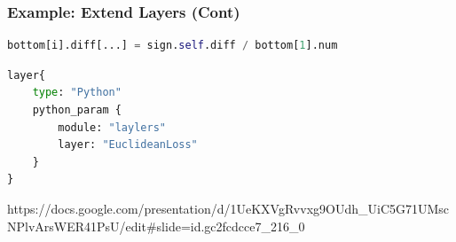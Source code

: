 
\begin{frame}[fragile]
  \MyLogo
  \frametitle{Example: Extend Layers (Cont)}  
  
\ContinueLineNumber
\begin{lstlisting}[language=python]
			bottom[i].diff[...] = sign.self.diff / bottom[1].num
\end{lstlisting}

\medskip

\begin{lstlisting}[language=python]
layer{
	type: "Python"
	python_param {
		module: "laylers"
		layer: "EuclideanLoss"
	}
}
\end{lstlisting}

\vskip 110pt

\tiny
\begin{center}
{
\color{red}https://docs.google.com/presentation/d/1UeKXVgRvvxg9OUdh\_UiC5G71UMscNPlvArsWER41PsU/edit\#slide=id.gc2fcdcce7\_216\_0
}
\end{center}
\end{frame}